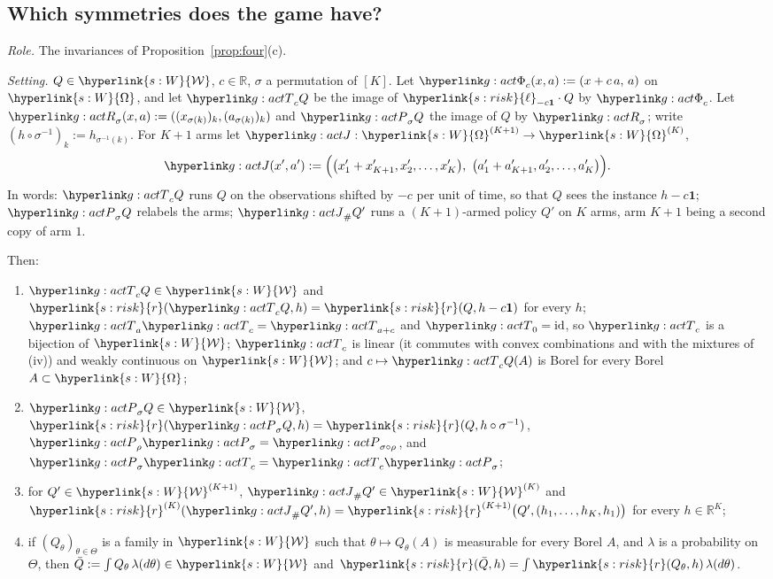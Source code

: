 \documentclass[11pt]{article}
\newcommand{\dt}[1]{\hypertarget{#1}{}}
\DeclareRobustCommand{\sy}[2]{{\hyperlink{#1}{#2}}}
\newcommand{\R}{\mathbb{R}}
\newcommand{\1}{\mathbf{1}}
\newcommand{\Wc}{\sy{s:W}{\mathcal W}}
\newcommand{\Om}{\sy{s:W}{\Omega}}
\newcommand{\rk}{\sy{s:risk}{r}}
\newcommand{\lh}{\sy{s:risk}{\ell}}
\begin{document}
\subsection{Which symmetries does the game have?}\label{sec:app-g-sym}

\begin{lemma}\label{lem:g-act}
\textit{Role.} The invariances of Proposition~\ref{prop:four}(c).

\noindent\textit{Setting.}\dt{g:act} $Q\in\Wc$, $c\in\R$, $\sigma$ a permutation of $[K]$. Let $\gPhi_c(x,a):=(x+c\,a,\,a)$ on $\Om$, and let $\gTc_cQ$ be the image of
$\lh_{-c\1}\cdot Q$ by $\gPhi_c$. Let $\gRs_\sigma(x,a):=((x_{\sigma(k)})_k,(a_{\sigma(k)})_k)$ and $\gPs_\sigma Q$ the image of $Q$ by $\gRs_\sigma$; write
$(h\circ\sigma^{-1})_k:=h_{\sigma^{-1}(k)}$. For $K+1$ arms let $\gJ:\Om^{(K+1)}\to\Om^{(K)}$,
\[
\gJ(x',a'):=\Big(\big(x'_1+x'_{K+1},x'_2,\dots,x'_K\big),\ \big(a'_1+a'_{K+1},a'_2,\dots,a'_K\big)\Big).
\]
In words: $\gTc_cQ$ runs $Q$ on the observations shifted by $-c$ per unit of time, so that $Q$ sees the instance $h-c\1$; $\gPs_\sigma Q$ relabels the arms;
$\gJ_\#Q'$ runs a $(K+1)$-armed policy $Q'$ on $K$ arms, arm $K+1$ being a second copy of arm $1$.

\noindent Then:
\begin{enumerate}
\item[(i)] $\gTc_cQ\in\Wc$ and $\rk(\gTc_cQ,h)=\rk(Q,h-c\1)$ for every $h$; $\gTc_a\gTc_c=\gTc_{a+c}$ and $\gTc_0=\mathrm{id}$, so $\gTc_c$ is a bijection of $\Wc$; $\gTc_c$ is
linear (it commutes with convex combinations and with the mixtures of (iv)) and weakly continuous on $\Wc$; and $c\mapsto\gTc_cQ(A)$ is Borel for every Borel $A\subset\Om$;
\item[(ii)] $\gPs_\sigma Q\in\Wc$, $\rk(\gPs_\sigma Q,h)=\rk(Q,h\circ\sigma^{-1})$, $\gPs_\rho\gPs_\sigma=\gPs_{\sigma\circ\rho}$, and $\gPs_\sigma\gTc_c=\gTc_c\gPs_\sigma$;
\item[(iii)] for $Q'\in\Wc^{(K+1)}$, $\gJ_\#Q'\in\Wc^{(K)}$ and $\rk^{(K)}(\gJ_\#Q',h)=\rk^{(K+1)}\big(Q',(h_1,\dots,h_K,h_1)\big)$ for every $h\in\R^K$;
\item[(iv)] if $(Q_\theta)_{\theta\in\Theta}$ is a family in $\Wc$ such that $\theta\mapsto Q_\theta(A)$ is measurable for every Borel $A$, and $\lambda$ is a probability on $\Theta$,
then $\bar Q:=\int Q_\theta\,\lambda(d\theta)\in\Wc$ and $\rk(\bar Q,h)=\int\rk(Q_\theta,h)\,\lambda(d\theta)$.
\end{enumerate}
\end{lemma}
\end{document}
